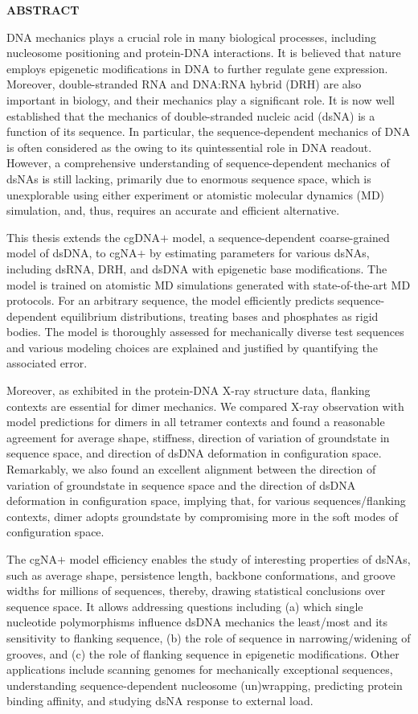 {\centerline {{\textbf{ABSTRACT}}}}
\vspace{0.75cm}

DNA mechanics plays a crucial role in many biological processes, including nucleosome positioning and protein-DNA interactions. It is believed that nature employs epigenetic modifications in DNA to further regulate gene expression. Moreover, double-stranded RNA and DNA:RNA hybrid (DRH) are also important in biology, and their mechanics play a significant role. It is now well established that the mechanics of double-stranded nucleic acid (dsNA) is a function of its sequence. In particular, the sequence-dependent mechanics of DNA is often considered as the  owing to its quintessential role in DNA readout. However, a comprehensive understanding of sequence-dependent mechanics of dsNAs is still lacking, primarily due to enormous sequence space, which is unexplorable using either experiment or atomistic molecular dynamics (MD) simulation, and, thus, requires an accurate and efficient alternative.

This thesis extends the cgDNA$+$ model, a sequence-dependent coarse-grained model of dsDNA, to cgNA$+$ by estimating parameters for various dsNAs, including dsRNA, DRH, and dsDNA with epigenetic base modifications. The model is trained on atomistic MD simulations generated with state-of-the-art MD protocols. For an arbitrary sequence, the model efficiently predicts sequence-dependent equilibrium distributions, treating bases and phosphates as rigid bodies. The model is thoroughly assessed for mechanically diverse test sequences and various modeling choices are explained and justified by quantifying the associated error.

Moreover, as exhibited in the protein-DNA X-ray structure data, flanking contexts are essential for dimer mechanics. We compared X-ray observation with model predictions for dimers in all tetramer contexts and found a reasonable agreement for average shape, stiffness, direction of variation of groundstate in sequence space, and direction of dsDNA deformation in configuration space. Remarkably, we also found an excellent alignment between the direction of variation of groundstate in sequence space and the direction of dsDNA deformation in configuration space, implying that, for various sequences/flanking contexts, dimer adopts groundstate by compromising more in the soft modes of configuration space.

The cgNA$+$ model efficiency enables the study of interesting properties of dsNAs, such as average shape, persistence length, backbone conformations, and groove widths for millions of sequences, thereby, drawing statistical conclusions over sequence space. It allows addressing questions including (a) which single nucleotide polymorphisms influence dsDNA mechanics the least/most and its sensitivity to flanking sequence, (b) the role of sequence in narrowing/widening of grooves, and (c) the role of flanking sequence in epigenetic modifications. Other applications include scanning genomes for mechanically exceptional sequences, understanding sequence-dependent nucleosome (un)wrapping, predicting protein binding affinity, and studying dsNA response to external load.

